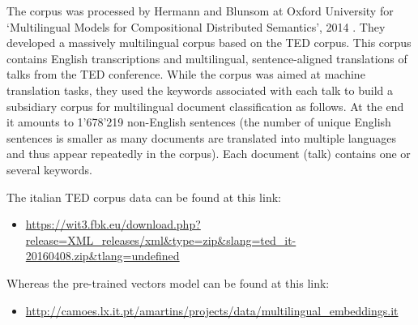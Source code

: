 The corpus was processed by Hermann and Blunsom at Oxford University for \enquote*{Multilingual Models for Compositional Distributed Semantics}, 2014 \cite{hermann2014multilingual}. They developed a massively multilingual corpus based on the TED corpus. This corpus contains English transcriptions and multilingual, sentence-aligned translations of talks from the TED conference.
While the corpus was aimed at machine translation tasks, they used the keywords associated with each talk to build a subsidiary corpus for multilingual document classification as follows.
At the end it amounts to 1'678'219 non-English sentences (the number of unique English sentences is smaller as many documents are translated into multiple languages and thus appear repeatedly in the corpus). Each document (talk) contains one or several keywords.

The italian TED corpus data can be found at this link:
\begin{itemize}
	\item \url{https://wit3.fbk.eu/download.php?release=XML_releases/xml\&type=zip\&slang=ted_it-20160408.zip\&tlang=undefined}
\end{itemize}
Whereas the pre-trained vectors model can be found at this link:
\begin{itemize}
	\item \url{http://camoes.lx.it.pt/amartins/projects/data/multilingual_embeddings.it}
\end{itemize}
